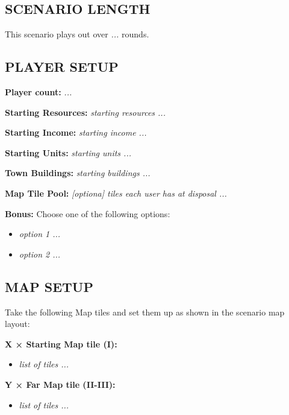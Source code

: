 
\begin{multicols*}{2}

\subsection*{\MakeUppercase{Scenario length}}

This scenario plays out over \textit{...} rounds.

\subsection*{\MakeUppercase{Player setup}}

\textbf{Player count:} \textit{...}

\textbf{Starting Resources:} \textit{starting resources ...}

\textbf{Starting Income:} \textit{starting income ...}

\textbf{Starting Units:} \textit{starting units ...}

\textbf{Town Buildings:} \textit{starting buildings ...}

\textbf{Map Tile Pool:} \textit{[optiona] tiles each user has at disposal ...}

\textbf{Bonus:} Choose one of the following options: 

\begin{itemize}
    \item \textit{option 1 ...}
    \item \textit{option 2 ...}
\end{itemize}

\subsection*{\MakeUppercase{Map setup}}

Take the following Map tiles and set them up as shown in the scenario map layout:

\textbf{X × Starting Map tile (I):}
\begin{itemize}
    \item \textit{list of tiles ...}
\end{itemize}

\textbf{Y × Far Map tile (II-III):}
\begin{itemize}
    \item \textit{list of tiles ...}
\end{itemize}


\end{multicols*}
